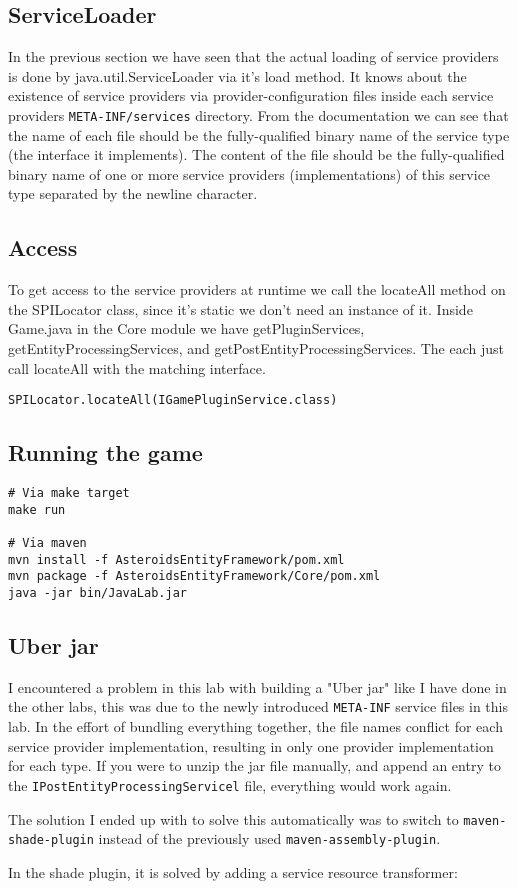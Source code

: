 \subsection{ServiceLoader}
In the previous section we have seen that the actual loading of service
providers is done by java.util.ServiceLoader via it's load method.
It knows about the existence of service providers via provider-configuration
files inside each service providers \texttt{META-INF/services} directory.
From the documentation \cite{oracle-service-loader} we can see that the name of each file should be the fully-qualified binary name of the service type (the interface it implements). The content of the file
should be the fully-qualified binary name of one or more service providers
(implementations) of this service type separated by the newline character.


\subsection{Access}
To get access to the service providers at runtime we call the locateAll method
on the SPILocator class, since it's static we don't need an instance of it.
Inside Game.java in the Core module we have getPluginServices,
getEntityProcessingServices, and getPostEntityProcessingServices.
The each just call locateAll with the matching interface.

\begin{verbatim}
SPILocator.locateAll(IGamePluginService.class)
\end{verbatim}

\subsection{Running the game}
\begin{verbatim}
# Via make target
make run

# Via maven
mvn install -f AsteroidsEntityFramework/pom.xml
mvn package -f AsteroidsEntityFramework/Core/pom.xml
java -jar bin/JavaLab.jar
\end{verbatim}

\subsection{Uber jar} \label{java-lab:uberjar}
I encountered a problem in this lab with building a "Uber jar" like I have done
in the other labs, this was due to the newly introduced \texttt{META-INF}
service files in this lab. In the effort of bundling everything together, the
file names conflict for each service provider implementation, resulting in only
one provider implementation for each type. If you were to unzip the jar file
manually, and append an entry to the \texttt{IPostEntityProcessingServicel} file,
everything would work again.

The solution I ended up with to solve this automatically was to switch to
\texttt{maven-shade-plugin} instead of the previously used
\texttt{maven-assembly-plugin}.

In the shade plugin, it is solved by adding a service resource transformer:
\inputminted{xml}{code/maven-shade.xml}


